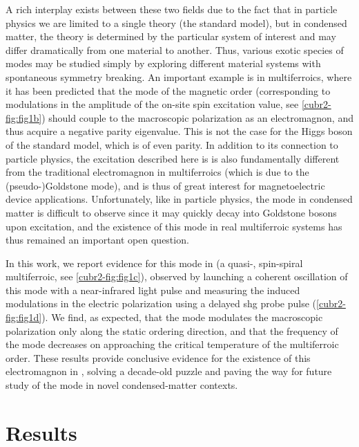 A rich interplay exists between these two fields due to the fact that in particle physics we are limited to a single theory (the standard model), but in condensed matter, the theory is determined by the particular system of interest and may differ dramatically from one material to another.
Thus, various exotic species of \higgs modes may be studied simply by exploring different material systems with spontaneous symmetry breaking.
An important example is in multiferroics, where it has been predicted\citep{matsumoto_electromagnon_2014,matsumoto_electromagnon_2015} that the \higgs mode of the magnetic order (corresponding to modulations in the amplitude of the on-site spin excitation value, see \cref{cubr2-fig:fig1b}) should couple to the macroscopic polarization as an electromagnon, and thus acquire a negative parity eigenvalue.
This is not the case for the Higgs boson of the standard model, which is of even parity\citep{atlas_collaboration_determination_2015_fixed}.
In addition to its connection to particle physics, the excitation described here is is also fundamentally different from the traditional electromagnon in multiferroics (which is due to the (pseudo-)Goldstone mode\citep{katsura_dynamical_2007}), and is thus of great interest for magnetoelectric device applications.
Unfortunately, like in particle physics, the \higgs mode in condensed matter is difficult to observe since it may quickly decay into Goldstone bosons upon excitation\cite{jain_higgs_2017}, and the existence of this mode in real multiferroic systems has thus remained an important open question.

In this work, we report evidence for this mode in  (a quasi-\oned, spin-spiral multiferroic, see \cref{cubr2-fig:fig1c}), observed by launching a coherent oscillation of this mode with a near-infrared light pulse and measuring the induced modulations in the electric polarization using a delayed \gls{shg} probe pulse (\cref{cubr2-fig:fig1d}).
We find, as expected, that the mode modulates the macroscopic polarization only along the static ordering direction, and that the frequency of the mode decreases on approaching the critical temperature of the multiferroic order.
These results provide conclusive evidence for the existence of this electromagnon in , solving a decade-old puzzle and paving the way for future study of the \higgs mode in novel condensed-matter contexts.

\section{Results}
